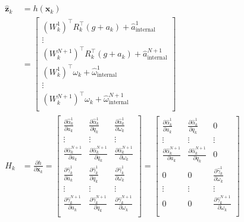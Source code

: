 \documentclass[11pt]{article}
\newcommand{\pd}[2]{\frac{\partial #1}{\partial #2}} %
\begin{document}
\begin{align*}
    \hat{\mathbf{z}}_k &= h(\mathbf{x}_k) \\
    &= \begin{bmatrix}
        (W_k^1)^\top R_k^\top (g + a_k) + \hat{a}^1_{\text{internal}} \\
        \vdots \\
        (W_k^{N+1})^\top R_k^\top (g + a_k) + \hat{a}^{N+1}_{\text{internal}} \\
        (W_k^1)^\top \omega_k + \hat{\omega}^1_{\text{internal}} \\
        \vdots \\
        (W_k^{N+1})^\top \omega_k + \hat{\omega}^{N+1}_{\text{internal}} \\
    \end{bmatrix} \\
    H_k &= \pd{h}{\mathbf{x}_k} = \begin{bmatrix}
        \pd{\hat{\alpha}^1_k}{a_k} & \pd{\hat{\alpha}^1_k}{q_k} & \pd{\hat{\alpha}^1_k}{\omega_k} \\
        \vdots & \vdots & \vdots \\
        \pd{\hat{\alpha}^{N+1}_k}{a_k} & \pd{\hat{\alpha}^{N+1}_k}{q_k} & \pd{\hat{\alpha}^{N+1}_k}{\omega_k} \\
        \pd{\hat{\gamma}^1_k}{a_k} & \pd{\hat{\gamma}^1_k}{q_k} & \pd{\hat{\gamma}^1_k}{\omega_k} \\
        \vdots & \vdots & \vdots \\
        \pd{\hat{\gamma}^{N+1}_k}{a_k} & \pd{\hat{\gamma}^{N+1}_k}{q_k} & \pd{\hat{\gamma}^{N+1}_k}{\omega_k} \\
    \end{bmatrix} = \begin{bmatrix}
        \pd{\hat{\alpha}^1_k}{a_k} & \pd{\hat{\alpha}^1_k}{q_k} & 0 \\
        \vdots & \vdots & \vdots \\
        \pd{\hat{\alpha}^{N+1}_k}{a_k} & \pd{\hat{\alpha}^{N+1}_k}{q_k} & 0 \\
        0 & 0 & \pd{\hat{\gamma}^1_k}{\omega_k} \\
        \vdots & \vdots & \vdots \\
        0 & 0 & \pd{\hat{\gamma}^{N+1}_k}{\omega_k} \\
    \end{bmatrix} \\

\end{align*}
\end{document}

